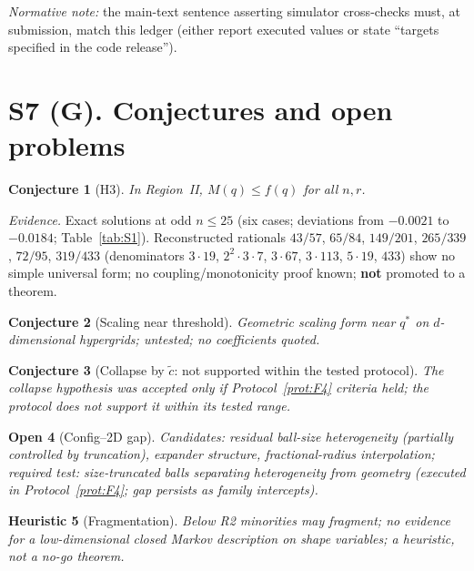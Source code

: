 \documentclass[preprint,12pt]{elsarticle}
\newtheorem{conjecture}{Conjecture}[section]
\newtheorem{openquestion}[conjecture]{Open}
\newtheorem{heuristic}[conjecture]{Heuristic}
\newcommand{\ctil}{\tilde{c}}
\begin{document}
\emph{Normative note:} the main-text sentence asserting simulator
cross-checks must, at submission, match this ledger (either report
executed values or state ``targets specified in the code release'').

\section{S7 (G). Conjectures and open problems}
\label{sec:G}

\begin{conjecture}[H3]
\label{conj:G1}
In Region~II, $M(q)\le f(q)$ for all $n,r$.
\end{conjecture}

\emph{Evidence.} Exact solutions at odd $n\le25$ (six cases; deviations
from $-0.0021$ to $-0.0184$; Table~\ref{tab:S1}). Reconstructed
rationals $43/57$, $65/84$, $149/201$, $265/339$, $72/95$, $319/433$
(denominators $3\cdot19$, $2^2\cdot3\cdot7$, $3\cdot67$, $3\cdot113$,
$5\cdot19$, $433$) show no simple universal form; no
coupling/monotonicity proof known; \textbf{not} promoted to a theorem.

\begin{conjecture}[Scaling near threshold]
\label{conj:G2}
Geometric scaling form near $q^\ast$ on $d$-dimensional hypergrids;
untested; no coefficients quoted.
\end{conjecture}

\begin{conjecture}[Collapse by $\ctil$: not supported within the tested protocol]
\label{conj:G3}
The collapse hypothesis was accepted only if Protocol~\ref{prot:F4}
criteria held; the protocol does not support it within its tested range.
\end{conjecture}

\begin{openquestion}[Config--2D gap]
\label{open:G4}
Candidates: residual ball-size heterogeneity (partially controlled by
truncation), expander structure, fractional-radius interpolation;
required test: size-truncated balls separating heterogeneity from
geometry (executed in Protocol~\ref{prot:F4}; gap persists as family
intercepts).
\end{openquestion}

\begin{heuristic}[Fragmentation]
\label{heur:G5}
Below R2 minorities may fragment; no evidence for a low-dimensional
closed Markov description on shape variables; a heuristic, not a no-go
theorem.
\end{heuristic}
\end{document}

